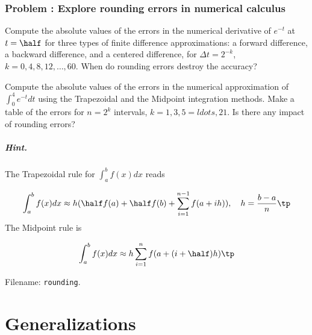 \documentclass[graybox,sectrefs,envcountresetchap,open=right,final]{svmonodo}
\newenvironment{doconceexercise}{}{}
\newcounter{doconceexercisecounter}
\begin{document}
\begin{doconceexercise}

\subsection*{Problem \thedoconceexercisecounter: Explore rounding errors in numerical calculus}

\label{decay:analysis:exer:rounding}


Compute the absolute values of the errors in the numerical derivative
of $e^{-t}$ at $t=\half$ for three types of finite difference
approximations: a forward difference, a backward difference, and
a centered difference, for $\Delta t = 2^{-k}$, $k=0,4, 8, 12, \ldots, 60$.
When do rounding errors destroy the accuracy?



Compute the absolute values of the errors in the numerical
approximation of $\int_0^4 e^{-t}dt$ using the Trapezoidal
and the Midpoint integration methods. Make a table of
the errors for $n=2^k$ intervals, $k=1,3,5=ldots,21$.
Is there any impact of rounding errors?


\paragraph{Hint.}
The Trapezoidal rule for $\int_a^bf(x)dx$ reads

\[ \int_a^bf(x)dx\approx h(\half f(a) + \half f(b) + \sum_{i=1}^{n-1}
f(a+ih)),\quad h = \frac{b-a}{n}\tp\]
The Midpoint rule is

\[ \int_a^bf(x)dx\approx h\sum_{i=1}^n f(a + (i+\half)h)\tp\]





\noindent Filename: \texttt{rounding}.

\end{doconceexercise}


\chapter{Generalizations}
\end{document}
